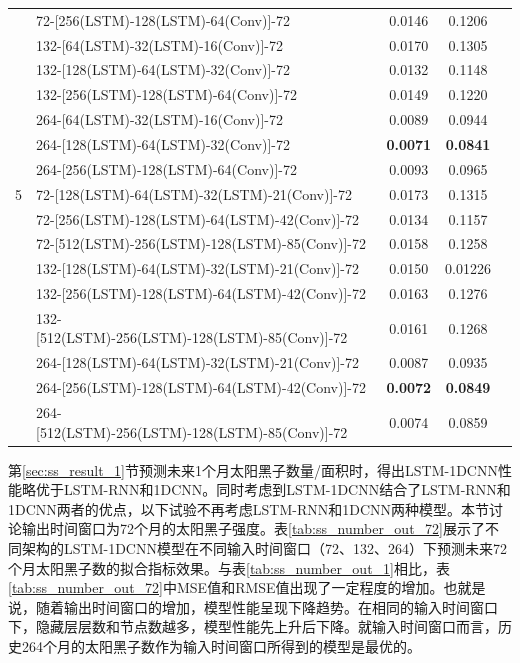 \begin{table}[!htbp]
\begin{tabular}{clccc}
      & 72-[256(LSTM)-128(LSTM)-64(Conv)]-72 & 0.0146 & 0.1206 \\
      & 132-[64(LSTM)-32(LSTM)-16(Conv)]-72 & 0.0170 & 0.1305 \\
      & 132-[128(LSTM)-64(LSTM)-32(Conv)]-72 & 0.0132 & 0.1148 \\
      & 132-[256(LSTM)-128(LSTM)-64(Conv)]-72 & 0.0149 & 0.1220 \\
      & 264-[64(LSTM)-32(LSTM)-16(Conv)]-72 & 0.0089 & 0.0944 \\
      & 264-[128(LSTM)-64(LSTM)-32(Conv)]-72 & \textbf{0.0071} & \textbf{0.0841} \\
      & 264-[256(LSTM)-128(LSTM)-64(Conv)]-72 & 0.0093 & 0.0965 \\
    \hline
    5 & 72-[128(LSTM)-64(LSTM)-32(LSTM)-21(Conv)]-72 & 0.0173 & 0.1315 \\
      & 72-[256(LSTM)-128(LSTM)-64(LSTM)-42(Conv)]-72 & 0.0134 & 0.1157 \\
      & 72-[512(LSTM)-256(LSTM)-128(LSTM)-85(Conv)]-72 & 0.0158 & 0.1258 \\
      & 132-[128(LSTM)-64(LSTM)-32(LSTM)-21(Conv)]-72 & 0.0150 & 0.01226 \\
      & 132-[256(LSTM)-128(LSTM)-64(LSTM)-42(Conv)]-72 & 0.0163 & 0.1276 \\
      & 132-[512(LSTM)-256(LSTM)-128(LSTM)-85(Conv)]-72 & 0.0161 &  0.1268\\
      & 264-[128(LSTM)-64(LSTM)-32(LSTM)-21(Conv)]-72 & 0.0087 & 0.0935 \\
      & 264-[256(LSTM)-128(LSTM)-64(LSTM)-42(Conv)]-72 & \textbf{0.0072} & \textbf{0.0849} \\
      & 264-[512(LSTM)-256(LSTM)-128(LSTM)-85(Conv)]-72 & 0.0074 & 0.0859 \\
    \bottomrule
  \end{tabular}
\end{table}

第\ref{sec:ss_result_1}节预测未来1个月太阳黑子数量/面积时，得出LSTM-1DCNN性能略优于LSTM-RNN和1DCNN。同时考虑到LSTM-1DCNN结合了LSTM-RNN和1DCNN两者的优点，以下试验不再考虑LSTM-RNN和1DCNN两种模型。本节讨论输出时间窗口为72个月的太阳黑子强度。表\ref{tab:ss_number_out_72}展示了不同架构的LSTM-1DCNN模型在不同输入时间窗口（72、132、264）下预测未来72个月太阳黑子数的拟合指标效果。与表\ref{tab:ss_number_out_1}相比，表\ref{tab:ss_number_out_72}中MSE值和RMSE值出现了一定程度的增加。也就是说，随着输出时间窗口的增加，模型性能呈现下降趋势。在相同的输入时间窗口下，隐藏层层数和节点数越多，模型性能先上升后下降。就输入时间窗口而言，历史264个月的太阳黑子数作为输入时间窗口所得到的模型是最优的。

